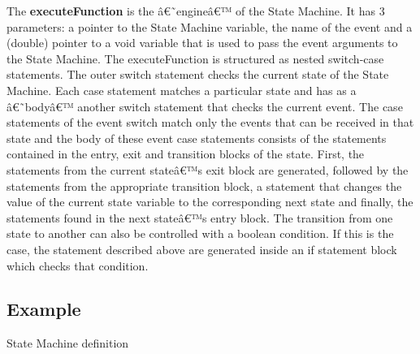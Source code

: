 \documentclass[a4paper,10pt,titlepage]{report}
\begin{document}
The \textbf{executeFunction} is the â€˜engineâ€™ of the State Machine. It has 3 parameters:  a pointer to the State Machine variable, the name of the event and a (double) pointer to a void variable that is used to pass the event arguments to the State Machine.
The executeFunction is structured as nested switch-case statements.
The outer switch statement checks the current state of the State Machine. Each case statement matches a particular state and has as a â€˜bodyâ€™ another switch statement that checks the current event. The case statements of the event switch match only the events  that can be received in that state and the body of these event case statements consists of the statements contained in the entry, exit and transition blocks of the state. First, the statements from the current stateâ€™s exit block are generated, followed by the statements from the appropriate transition block, a statement that changes the value of the current state variable to the corresponding next state and finally, the statements found in the next stateâ€™s entry block. 
The transition from one state to another can also be controlled with a boolean condition. If this is the case, the statement described above are generated inside an if statement block which checks that condition.

\newpage

\subsection{Example}
{\setlength{\parindent}{0cm}
State Machine definition
}
\end{document}
